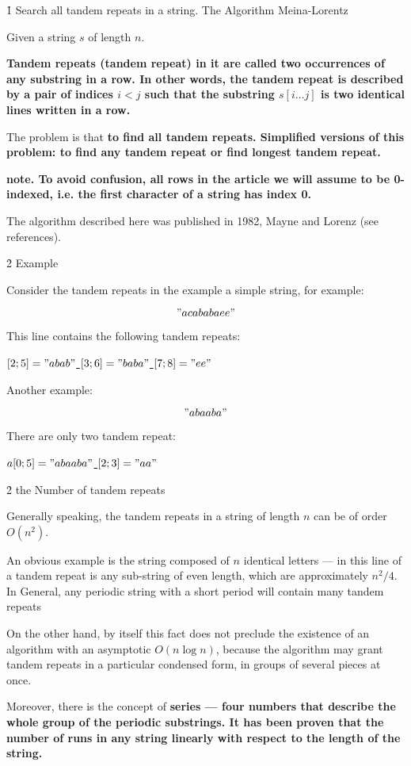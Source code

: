 \h1{ Search all tandem repeats in a string. The Algorithm Meina-Lorentz }

Given a string $s$ of length $n$.

\bf{Tandem repeats} (tandem repeat) in it are called two occurrences of any substring in a row. In other words, the tandem repeat is described by a pair of indices $i < j$ such that the substring $s[i \ldots j]$ is two identical lines written in a row.

The problem is that \bf{to find all tandem repeats}. Simplified versions of this problem: to find \bf{any} tandem repeat or find \bf{longest} tandem repeat.

\bf{note}. To avoid confusion, all rows in the article we will assume to be 0-indexed, i.e. the first character of a string has index 0.

The algorithm described here was published in 1982, Mayne and Lorenz (see references).


\h2{ Example }

Consider the tandem repeats in the example a simple string, for example:

$$ "acababaee" $$

This line contains the following tandem repeats:

\ul{
\li $[2;5] = "abab"$
\li $[3;6] = "baba"$
\li $[7;8] = "ee"$
}

Another example:

$$ "abaaba" $$

There are only two tandem repeat:

\ul{
\li $a[0;5] = "abaaba"$
\li $[2;3] = "aa"$
}


\h2{ the Number of tandem repeats }

Generally speaking, the tandem repeats in a string of length $n$ can be of order $O(n^2)$.

An obvious example is the string composed of $n$ identical letters --- in this line of a tandem repeat is any sub-string of even length, which are approximately $n^2 / 4$. In General, any periodic string with a short period will contain many tandem repeats

On the other hand, by itself this fact does not preclude the existence of an algorithm with an asymptotic $O (n \log n)$, because the algorithm may grant tandem repeats in a particular condensed form, in groups of several pieces at once.

Moreover, there is the concept of \bf{series} --- four numbers that describe the whole group of the periodic substrings. It has been proven that the number of runs in any string linearly with respect to the length of the string.

